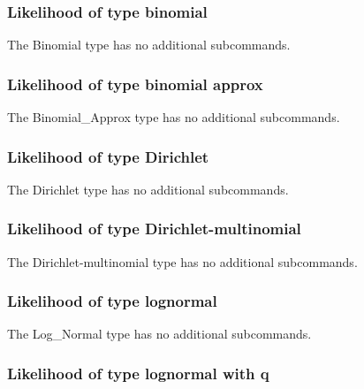 \label{syntax:Likelihood}

\subsubsection{Likelihood of type binomial}
\label{syntax:Likelihood-Binomial}

The Binomial type has no additional subcommands.

\subsubsection{Likelihood of type binomial approx}
\label{syntax:Likelihood-BinomialApprox}

The Binomial\_Approx type has no additional subcommands.

\subsubsection{Likelihood of type Dirichlet}
\label{syntax:Likelihood-Dirichlet}

The Dirichlet type has no additional subcommands.

\subsubsection{Likelihood of type Dirichlet-multinomial}
\label{syntax:Likelihood-Dirichlet-Multinomial}

The Dirichlet-multinomial type has no additional subcommands.

\subsubsection{Likelihood of type lognormal}
\label{syntax:Likelihood-LogNormal}

The Log\_Normal type has no additional subcommands.

\subsubsection{Likelihood of type lognormal with q}
\label{syntax:Likelihood-LogNormalWithQ}

